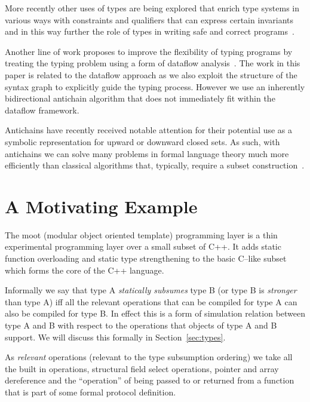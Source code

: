 \documentclass{sigplanconf}
\newcommand{\concept}[1]{\emph{#1}}
\begin{document}
More recently other uses of types are being explored that enrich type
systems in various ways with constraints and qualifiers that can
express certain invariants and in this way further the role of types
in writing safe and correct programs~\cite{Foster2006,Nystrom2008}.

Another line of work proposes to improve the flexibility of typing
programs by treating the typing problem using a form of dataflow
analysis~\cite{Tenenbaum1974,Kaplan1980,Khedker2003}.
The work in this paper is related to the dataflow approach as we also
exploit the structure of the syntax graph to explicitly guide the
typing process. However we use an inherently bidirectional antichain
algorithm that does not immediately fit within the dataflow framework.

Antichains have recently received notable attention for their
potential use as a symbolic representation for upward or downward
closed sets. As such, with antichains we can solve many problems in
formal language theory much more efficiently than classical algorithms
that, typically, require a subset
construction~\cite{wulf_antichains:_2006}.

\section{A Motivating Example}\label{sec:motivating}

The {\sc moot} (modular object oriented template) programming layer is
a thin experimental programming layer over a small subset of C++. It
adds static function overloading and static type strengthening to the
basic C--like subset which forms the core of the C++ language.

Informally we say that type A \concept{statically subsumes} type B (or
type B is \concept{stronger} than type A) iff all the relevant
operations that can be compiled for type A can also be compiled for
type B. In effect this is a form of simulation relation between type A
and B with respect to the operations that objects of type A and B
support. We will discuss this formally in Section~\ref{sec:types}.

As \emph{relevant} operations (relevant to the type subsumption
ordering) we take all the built in operations, structural field select
operations, pointer and array dereference and the ``operation'' of
being passed to or returned from a function that is part of some
formal protocol definition.
\end{document}
